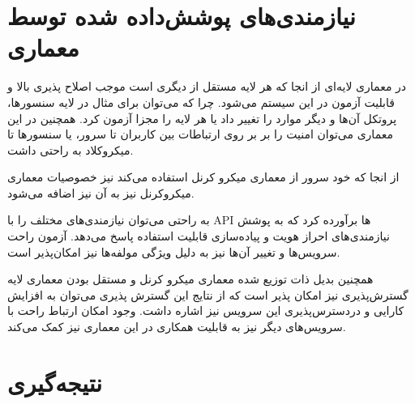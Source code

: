 \section{نیازمندی‌های پوشش‌داده شده توسط معماری}

در معماری لایه‌ای از انجا که هر لایه مستقل از دیگری است موجب اصلاح ‌پذیری بالا و قابلیت آزمون در این سیستم می‌شود. چرا که می‌توان برای مثال  در لایه سنسور‌ها، پروتکل آن‌ها و دیگر موارد را تغییر داد یا هر لایه را مجزا آزمون کرد.
همچنین در این معماری می‌توان امنیت را بر بر روی ارتباطات بین کاربران تا سرور، یا سنسورها تا میکروکلاد به راحتی داشت. 

از انجا که خود سرور از معماری میکرو کرنل استفاده می‌کند نیز خصوصیات معماری میکروکرنل نیز به آن نیز اضافه می‌شود. 

به راحتی می‌توان نیازمندی‌های مختلف را با API ها برآورده کرد که به پوشش نیازمندی‌های احراز هویت و پیاده‌سازی قابلیت استفاده پاسخ می‌دهد. آزمون راحت سرویس‌ها و تغییر آن‌ها نیز به دلیل ویژگی‌  
مولفه‌ها نیز امکان‌پذیر است. 

همچنین بدیل ذات توزیع شده معماری میکرو کرنل و مستقل بودن معماری لایه گسترش‌پذیری نیز امکان پذیر است که از نتایج این گسترش پذیری می‌توان به افزایش کارایی و دردسترس‌پذیری این سرویس نیز اشاره داشت.
وجود امکان ارتباط راحت با سرویس‌های دیگر نیز به قابلیت همکاری در این معماری نیز کمک می‌کند.

\section{نتیجه‌گیری}